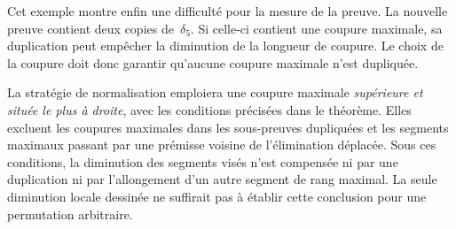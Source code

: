 \documentclass[../../../include/open-logic-section]{subfiles}
\begin{document}
Cet exemple montre enfin une difficulté
pour la mesure de la preuve. La nouvelle
preuve contient deux copies de~$\delta_5$.
Si celle-ci contient une coupure maximale,
sa duplication peut empêcher la diminution
de la longueur de coupure. Le choix de
la coupure doit donc garantir qu'aucune
coupure maximale n'est dupliquée.

La stratégie de normalisation emploiera une
coupure maximale \emph{supérieure et située
le plus à droite}, avec les conditions
précisées dans le théorème. Elles excluent
les coupures maximales dans les sous-preuves
dupliquées et les segments maximaux passant
par une prémisse voisine de l'élimination
déplacée. Sous ces conditions, la diminution
des segments visés n'est compensée ni par
une duplication ni par l'allongement d'un
autre segment de rang maximal.
La seule diminution locale dessinée ne
suffirait pas à établir cette conclusion
pour une permutation arbitraire.
\end{document}
